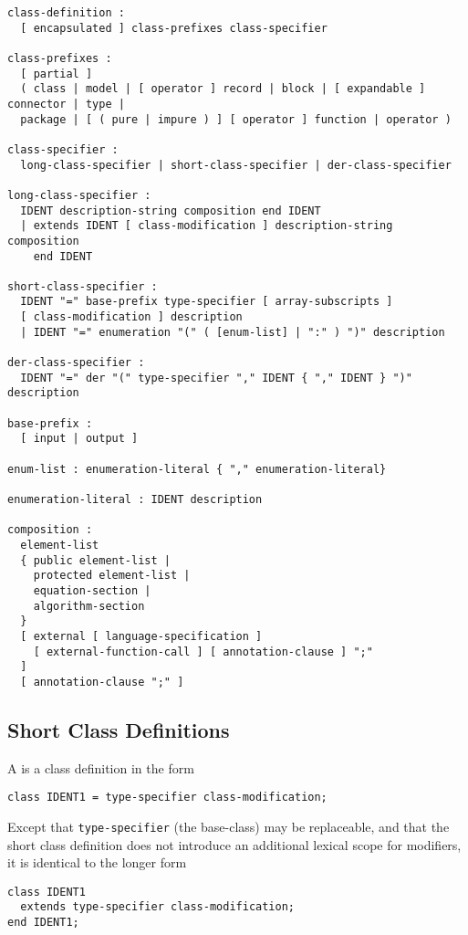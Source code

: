 \begin{lstlisting}[language=grammar]
class-definition :
  [ encapsulated ] class-prefixes class-specifier

class-prefixes :
  [ partial ]
  ( class | model | [ operator ] record | block | [ expandable ] connector | type |
  package | [ ( pure | impure ) ] [ operator ] function | operator )

class-specifier :
  long-class-specifier | short-class-specifier | der-class-specifier

long-class-specifier :
  IDENT description-string composition end IDENT
  | extends IDENT [ class-modification ] description-string composition
    end IDENT

short-class-specifier :
  IDENT "=" base-prefix type-specifier [ array-subscripts ]
  [ class-modification ] description
  | IDENT "=" enumeration "(" ( [enum-list] | ":" ) ")" description

der-class-specifier :
  IDENT "=" der "(" type-specifier "," IDENT { "," IDENT } ")" description

base-prefix :
  [ input | output ]

enum-list : enumeration-literal { "," enumeration-literal}

enumeration-literal : IDENT description

composition :
  element-list
  { public element-list |
    protected element-list |
    equation-section |
    algorithm-section
  }
  [ external [ language-specification ]
    [ external-function-call ] [ annotation-clause ] ";"
  ]
  [ annotation-clause ";" ]
\end{lstlisting}

\subsection{Short Class Definitions}\label{short-class-definitions}

A  is a class definition in the form
\begin{lstlisting}[language=modelica]
class IDENT1 = type-specifier class-modification;
\end{lstlisting}
Except that \lstinline!type-specifier! (the base-class) may be replaceable, and that the short class definition does not introduce an additional lexical scope for modifiers, it is identical to the longer form
\begin{lstlisting}[language=modelica]
class IDENT1
  extends type-specifier class-modification;
end IDENT1;
\end{lstlisting}

